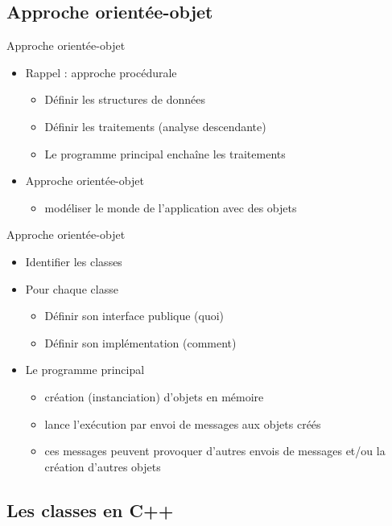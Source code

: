 \subsection{Approche orientée-objet}

\begin{frame}{Approche orientée-objet}
\begin{itemize}
	\pause \item Rappel : approche procédurale
	\begin{itemize}
		\item Définir les structures de données
		\item Définir les traitements (analyse descendante)
		\item Le programme principal enchaîne les traitements
	\end{itemize}
	\pause \item Approche orientée-objet
	\begin{itemize}
		\item modéliser le monde de l'application avec des objets
	\end{itemize}
\end{itemize}
\end{frame}

\begin{frame}{Approche orientée-objet}
	\begin{itemize}
		\pause \item Identifier les classes
		\pause \item Pour chaque classe
		\begin{itemize}
			\item Définir son interface publique (quoi)
			\item Définir son implémentation (comment)
		\end{itemize}
		\pause \item Le programme principal
		\begin{itemize}
			\item création (instanciation) d'objets en mémoire
			\item lance l'exécution par envoi de messages aux objets créés
			\item ces messages peuvent provoquer d'autres envois de messages et/ou
			la création d'autres objets
		\end{itemize}
	\end{itemize}
\end{frame}

\subsection{Les classes en C++}

